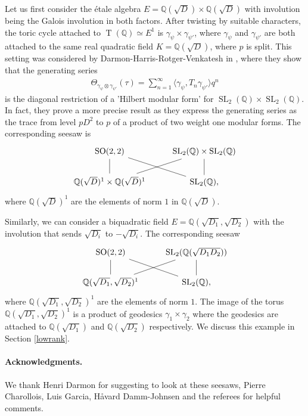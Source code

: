 \documentclass[11pt]{article} %
\newcommand{\8}{\infty}
\newcommand{\Tbf}{\operatorname{T}}
\newcommand{\SO}{\operatorname{SO}}
\newcommand{\SL}{\operatorname{SL}}
\newcommand{\Q}{\mathbb{Q}}
\theoremstyle{mytheoremstyle}
\theoremstyle{remark}
\numberwithin{equation}{section}
\begin{document}
Let us first consider the \'etale algebra $E=\Q(\sqrt{D}) \times \Q(\sqrt{D})$ with involution being the Galois involution in both factors. After twisting by suitable characters, the toric cycle attached to $\Tbf(\Q) \simeq E^1$ is $\gamma_\psi \times \gamma_{\psi'}$, where $\gamma_{\psi}$ and $\gamma_{\psi'}$ are both attached to the same real quadratic field $K=\Q(\sqrt{D})$, where $p$ is split. This setting was considered by Darmon-Harris-Rotger-Venkatesh in \cite{dhrv}, where they show that the generating series
\begin{align}\label{eqdhrv}
    \Theta_{\gamma_{\psi} \otimes \gamma_{\psi'}}(\tau)= \sum_{n =1}^\8 \langle \gamma_{\psi},T_n\gamma_{\psi'} \rangle q^n
\end{align} is the diagonal restriction of a 'Hilbert modular form' for $\SL_2(\Q)\times \SL_2(\Q)$. In fact, they prove a more precise result as they express the generating series as the trace from level $pD^2$ to $p$ of a product of two weight one modular forms. The corresponding seesaw is 
\[
\begin{tikzcd}
\SO(2,2) \arrow[dash, dr] & \SL_2(\Q) \times \SL_2(\Q) \\
\Q(\sqrt{D})^1\times \Q(\sqrt{D})^1 \arrow[dash]{u} \arrow[dash, ru] & \SL_2(\Q), \arrow[dash]{u}
\end{tikzcd}
\]
where $\Q(\sqrt{D})^1$ are the elements of norm $1$ in $\Q(\sqrt{D})$.

Similarly, we can consider a biquadratic field $E=\Q(\sqrt{D_1},\sqrt{D_2})$ with the involution that sends $\sqrt{D_i}$ to $-\sqrt{D_i}$. The corresponding seesaw
\[
\begin{tikzcd}
\SO(2,2) \arrow[dash, dr] & \SL_2(\Q(\sqrt{D_1D_2})) \\
\Q(\sqrt{D_1},\sqrt{D_2})^1 \arrow[dash]{u} \arrow[dash, ru] & \SL_2(\Q), \arrow[dash]{u}
\end{tikzcd}
\]
where $\Q(\sqrt{D_1},\sqrt{D_2})^1$ are the elements of norm $1$. The image of the torus $\Q(\sqrt{D_1},\sqrt{D_2})^1$ is a product of geodesics $\gamma_1 \times \gamma_2$ where the geodesics are attached to $\Q(\sqrt{D_1})$ and $\Q(\sqrt{D_2})$ respectively. We discuss this example in Section \ref{lowrank}.

\paragraph{Acknowledgments.} We thank Henri Darmon for suggesting to look at these seesaws, Pierre Charollois, Luis Garcia, H\aa vard Damm-Johnsen and the referees for helpful comments.
\end{document}
